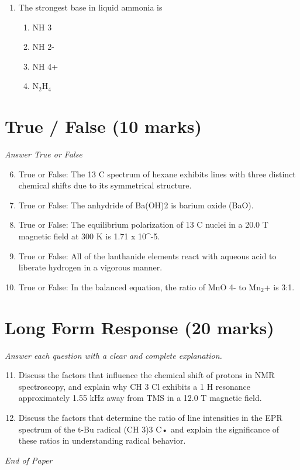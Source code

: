 \documentclass[12pt]{article}
\begin{document}
\begin{enumerate}[label=\arabic*.]
\begin{enumerate}[label=(\alph*)]
    \item It significantly increases the pH.
    \item It significantly decreases the pH.
    \item It changes the pH asymptotically to the pKa of the acid.
\end{enumerate}
\item The strongest base in liquid ammonia is
\begin{enumerate}[label=(\alph*)]
    \item NH 3
    \item NH 2-
    \item NH 4+
    \item N$_{2}$H$_{4}$
\end{enumerate}
\end{enumerate}

\section*{True / False (10 marks)}
\textit{Answer True or False}
\begin{enumerate}[label=\arabic*.]
\setcounter{enumi}{5}
\item True or False: The 13 C spectrum of hexane exhibits lines with three distinct chemical shifts due to its symmetrical structure.
\item True or False: The anhydride of Ba(OH)2 is barium oxide (BaO).
\item True or False: The equilibrium polarization of 13 C nuclei in a 20.0 T magnetic field at 300 K is 1.71 x 10^-5.
\item True or False: All of the lanthanide elements react with aqueous acid to liberate hydrogen in a vigorous manner.
\item True or False: In the balanced equation, the ratio of MnO 4- to Mn$_{2}$+ is 3:1.
\end{enumerate}

\section*{Long Form Response (20 marks)}
\textit{Answer each question with a clear and complete explanation.}
\begin{enumerate}[label=\arabic*.]
\setcounter{enumi}{10}
\item Discuss the factors that influence the chemical shift of protons in NMR spectroscopy, and explain why CH 3 Cl exhibits a 1 H resonance approximately 1.55 kHz away from TMS in a 12.0 T magnetic field.
\item Discuss the factors that determine the ratio of line intensities in the EPR spectrum of the t-Bu radical (CH 3)3 C• and explain the significance of these ratios in understanding radical behavior.
\end{enumerate}

\vfill
\noindent\textit{End of Paper}
\end{document}
